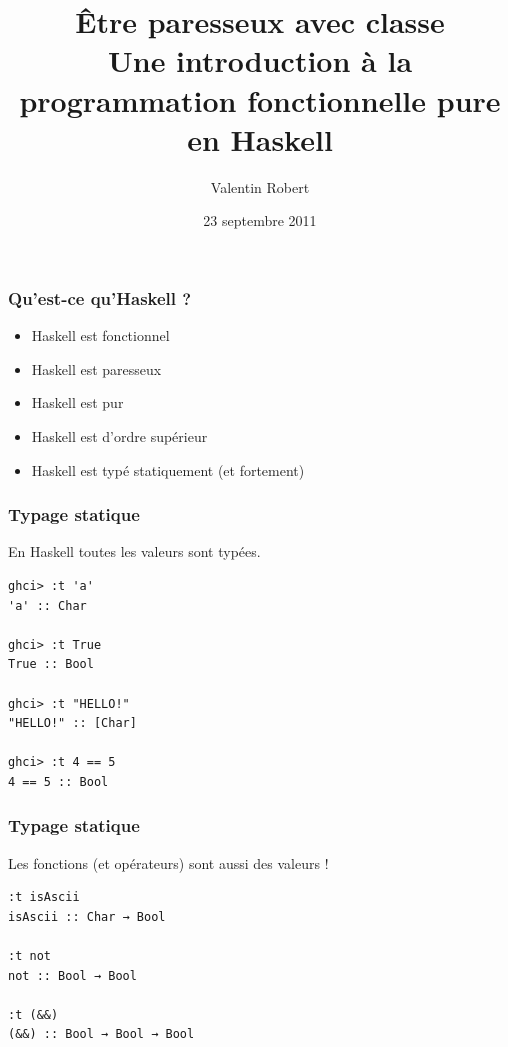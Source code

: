 \documentclass[10pt]{beamer}
\title[Haskell]{Être paresseux avec classe\\
Une introduction à la programmation fonctionnelle pure en Haskell}
\author{Valentin Robert}
\institute{INRIA}
\date{23 septembre 2011}
\begin{document}
\begin{frame}
\titlepage
\end{frame}



\begin{frame}
\frametitle{Qu'est-ce qu'Haskell ?}

\begin{itemize}

\item Haskell est fonctionnel

\pause

\item Haskell est paresseux

\pause

\item Haskell est pur

\pause

\item Haskell est d'ordre supérieur

\pause

\item Haskell est typé statiquement (et fortement)

\end{itemize}

\end{frame}



\begin{frame}[fragile]
\frametitle{Typage statique}
En Haskell toutes les valeurs sont typées.
\begin{verbatim}
ghci> :t 'a'
'a' :: Char

ghci> :t True
True :: Bool

ghci> :t "HELLO!"
"HELLO!" :: [Char]

ghci> :t 4 == 5
4 == 5 :: Bool
\end{verbatim}
\end{frame}



\begin{frame}[fragile]
\frametitle{Typage statique}
Les fonctions (et opérateurs) sont aussi des valeurs !
\begin{verbatim}
:t isAscii
isAscii :: Char → Bool

:t not
not :: Bool → Bool

:t (&&)
(&&) :: Bool → Bool → Bool
\end{verbatim}
\end{frame}
\end{document}
